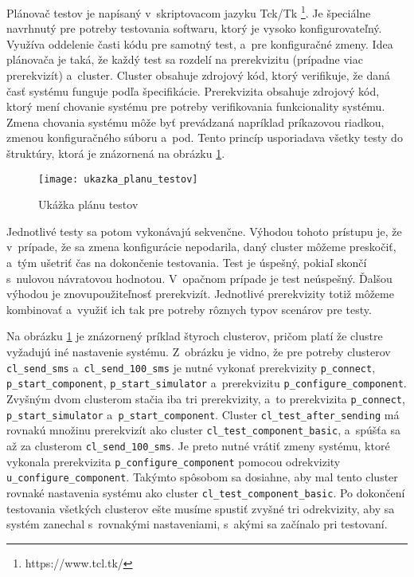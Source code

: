 Plánovač testov je napísaný v~skriptovacom jazyku Tck/Tk
\footnote{https://www.tcl.tk/}. 
Je špeciálne navrhnutý pre potreby testovania softwaru, ktorý je vysoko 
konfigurovateľný. Využíva oddelenie časti kódu pre samotný test, 
a~pre konfiguračné zmeny. Idea plánovača je taká, že každý test sa 
rozdelí na prerekvizitu (prípadne viac prerekvizít) a~cluster. Cluster 
obsahuje zdrojový kód, ktorý verifikuje, že daná časť systému funguje 
podľa špecifikácie. Prerekvizita obsahuje zdrojový kód, ktorý mení 
chovanie systému pre potreby verifikovania funkcionality systému.
Zmena chovania systému môže byť prevádzaná napríklad príkazovou riadkou, 
zmenou konfiguračného súboru a~pod.
Tento princíp usporiadava všetky testy do štruktúry, ktorá je znázornená 
na obrázku \ref{obrazok:ukazka_planu_testov}.

\begin{figure}[h]
    \begin{center}
    \texttt{[image: ukazka\_planu\_testov]}
    \caption{Ukážka plánu testov}
    \label{obrazok:ukazka_planu_testov}
    \end{center}
\end{figure}

Jednotlivé testy sa potom vykonávajú sekvenčne. Výhodou tohoto prístupu 
je, že v~prípade, že sa zmena konfigurácie nepodarila, daný cluster 
môžeme preskočiť, a~tým ušetriť čas na dokončenie testovania. 
Test je úspešný, pokiaľ skončí s~nulovou návratovou hodnotou. 
V~opačnom prípade je test neúspešný.  
Ďalšou výhodou je znovupoužiteľnosť prerekvizít. 
Jednotlivé prerekvizity totiž môžeme kombinovať a~využiť ich tak pre 
potreby rôznych typov scenárov pre testy. 

Na obrázku \ref{obrazok:ukazka_planu_testov} je znázornený príklad štyroch 
clusterov, pričom platí že clustre vyžadujú iné nastavenie systému. 
Z~obrázku je vidno, že pre potreby clusterov \texttt {cl\_send\_sms}
a~\texttt {cl\_send\_100\_sms} je nutné vykonať prerekvizity \texttt{p\_connect}, 
\texttt{p\_start\_component}, \texttt{p\_start\_simulator} a~prerekvizitu 
\texttt{p\_configure\_component}. Zvyšným dvom clusterom stačia iba tri prerekvizity, a~to prerekvizita \texttt{p\_connect}, \texttt{p\_start\_simulator}
a~\texttt{p\_start\_component}. Cluster \texttt{cl\_test\_after\_sending} má rovnakú množinu prerekvizít ako cluster \texttt{cl\_test\_component\_basic}, 
a~spúšťa sa až za clusterom \texttt{cl\_send\_100\_sms}. Je preto nutné vrátiť zmeny 
systému, ktoré vykonala prerekvizita \texttt{p\_configure\_component} pomocou odrekvizity
\texttt{u\_configure\_component}. Takýmto spôsobom sa dosiahne, aby mal tento cluster
rovnaké nastavenia systému ako cluster \texttt{cl\_test\_component\_basic}.
Po dokončení testovania všetkých clusterov ešte musíme spustiť zvyšné tri
odrekvizity, aby sa systém zanechal s~rovnakými nastaveniami, s~akými sa začínalo pri testovaní.

